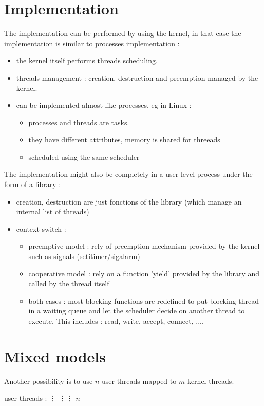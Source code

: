 \documentclass[a4paper,10pt]{article}
\begin{document}
\section{Implementation}

The implementation can be performed by using the kernel, in that case the implementation
is similar to processes implementation :

\begin{itemize}
\item the kernel itself performs threads scheduling.
\item threads management : creation, destruction and preemption managed by the kernel.
\item can be implemented almost like processes, eg in Linux :
\begin{itemize}
\item processes and threads are tasks.
\item they have different attributes, memory is shared for threeads
\item scheduled using the same scheduler
\end{itemize}
\end{itemize}

The implementation might also be completely in a user-level process under the form of a library :

\begin{itemize}
\item creation, destruction are just fonctions of the library (which manage an internal list of threads)
\item context switch :
\begin{itemize}
\item preemptive model : rely of preemption mechanism provided by  the kernel such as signals (setitimer/sigalarm)
\item cooperative model : rely on a function 'yield' provided by the library and called by the thread itself
\item both cases : most blocking functions are redefined to put blocking thread in a waiting queue and let the scheduler decide on another thread to execute. This includes : read, write, accept, connect, ....
\end{itemize}
\end{itemize}



\section{Mixed models}

Another possibility is to use $n$ user threads mapped to $m$ kernel threads.

user threads : \hspace{0.2cm} \vdots \hspace{0.2cm} \vdots \hspace{0.2cm}\vdots  \hspace{0.2cm}  $n$


 
\end{document}
